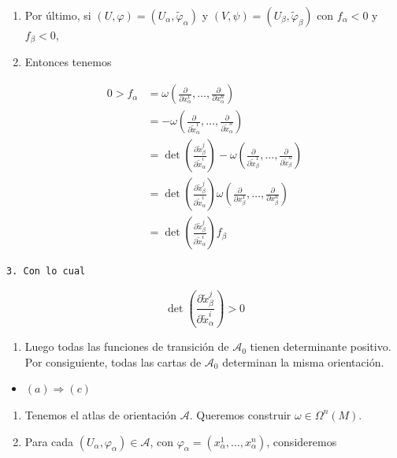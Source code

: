 \begin{bookproof}{}
\begin{itemize}
\begin{enumerate}
\item Por último, si $(U,\varphi)=(U_\alpha,\widetilde\varphi_\alpha)$ y $(V,\psi)=(U_\beta,\widetilde\varphi_\beta)$ con $f_\alpha<0$ y $f_\beta<0$,
\item Entonces tenemos
\end{enumerate}
\end{itemize}
\[
\begin{aligned} 0>f_\alpha & =\omega\!\left(\frac{\partial}{\partial x_\alpha^1},\ldots,\frac{\partial}{\partial x_\alpha^n}\right)\\&=-\omega\!\left(\frac{\partial}{\partial \widetilde x_\alpha^1},\ldots,\frac{\partial}{\partial \widetilde x_\alpha^n}\right)\\&=\det\!\left(\frac{\partial \widetilde x_\beta^j}{\partial \widetilde x_\alpha^i}\right)-\omega\!\left(\frac{\partial}{\partial \widetilde x_\beta^1},\ldots,\frac{\partial}{\partial \widetilde x_\beta^n}\right)\\& =\det\!\left(\frac{\partial \widetilde x_\beta^j}{\partial \widetilde x_\alpha^i}\right)\omega\!\left(\frac{\partial}{\partial  x_\beta^1},\ldots,\frac{\partial}{\partial  x_\beta^n}\right)\\&=\det\!\left(\frac{\partial \widetilde x_\beta^j}{\partial \widetilde x_\alpha^i}\right)f_{\beta }\end{aligned}
\]
\begin{Verbatim}[fontsize=\small]
 3. Con lo cual 
\end{Verbatim}
\[
\det\!\left(\frac{\partial \widetilde x_\beta^j}{\partial \widetilde x_\alpha^i}\right)>0
\]
\begin{enumerate}[start=4]
\item Luego todas las funciones de transición de $\mathcal A_0$ tienen determinante positivo. Por consiguiente, todas las cartas de $\mathcal A_0$ determinan la misma orientación.
\end{enumerate}
\begin{itemize}
\item \textbf{$(a)\Rightarrow (c)$}
\end{itemize}
\begin{enumerate}
\item Tenemos el atlas de orientación $\mathcal A$. Queremos construir $\omega\in\Omega^n(M)$.
\item Para cada $(U_\alpha,\varphi_\alpha)\in\mathcal A$, con $\varphi_\alpha=(x_\alpha^1,\ldots,x_\alpha^n)$, consideremos
\end{enumerate}

\end{bookproof}
